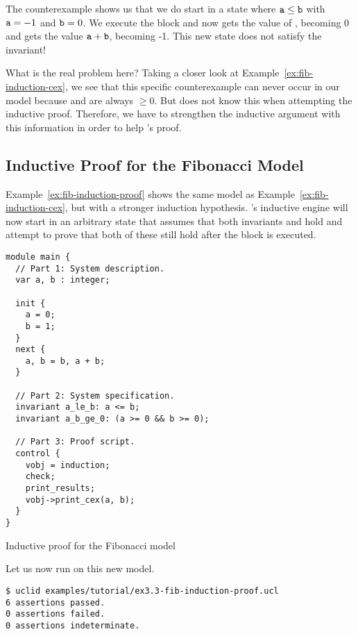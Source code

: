 The counterexample shows us that we do start in a state where $\texttt{a} \le \texttt{b}$ with $\texttt{a}=-1$ and $\texttt{b}=0$. We execute the  block and now  gets the value of , becoming 0 and  gets the value $\texttt{a} + \texttt{b}$, becoming -1. This new state does not satisfy the invariant!

What is the real problem here? Taking a closer look at Example~\ref{ex:fib-induction-cex}, we see that this specific counterexample can never occur in our model because  and  are always $\ge 0$. But \uclid{} does not know this when attempting the inductive proof. Therefore, we have to strengthen the inductive argument with this information in order to help \uclid{}'s proof.

\subsection{Inductive Proof for the Fibonacci Model}

Example~\ref{ex:fib-induction-proof} shows the same model as Example~\ref{ex:fib-induction-cex}, but with a stronger induction hypothesis. \uclid{}'s inductive engine will now start in an arbitrary state that assumes that both invariants  and  hold and attempt to prove that both of these still hold after the  block is executed.

\begin{uclidlisting}[htbp]
\begin{lstlisting}[language=uclid,style=uclidstyle]
module main {
  // Part 1: System description.
  var a, b : integer;

  init {
    a = 0;
    b = 1;
  }
  next {
    a, b = b, a + b;
  }

  // Part 2: System specification.
  invariant a_le_b: a <= b;
  invariant a_b_ge_0: (a >= 0 && b >= 0);

  // Part 3: Proof script.
  control {
    vobj = induction;
    check;
    print_results;
    vobj->print_cex(a, b);
  }
}
\end{lstlisting}
\caption{Inductive proof for the Fibonacci model}
\label{ex:fib-induction-proof}
\end{uclidlisting}

Let us now run \uclid{} on this new model.

\begin{Verbatim}[frame=single, samepage=true]
$ uclid examples/tutorial/ex3.3-fib-induction-proof.ucl 
6 assertions passed.
0 assertions failed.
0 assertions indeterminate.
\end{Verbatim}

